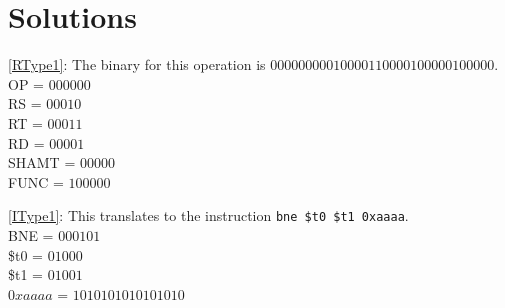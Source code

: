 \documentclass{article}
\begin{document}
\section{Solutions}

\ref{RType1}: The binary for this operation is $000000 00010 00011 00001 00000 100000$. \\ OP = $000000$ \\ RS = $00010$ \\ RT = $00011$ \\ RD = $00001$ \\ SHAMT = $00000$ \\ FUNC = $100000$

\ref{IType1}: This translates to the instruction \texttt{bne \$t0 \$t1 0xaaaa}. \\ BNE = $000101$ \\ \$t0 = $01000$ \\ \$t1 = $01001$ \\ $0xaaaa$ = $1010101010101010$

\printindex
\end{document}
